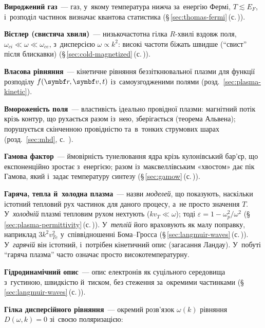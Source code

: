 	\item \textbf{Вироджений газ}~--- газ, у~якому температура нижча за~енергію Фермі, $T\lesssim E_F$, і~розподіл
	  частинок визначає квантова статистика (§\,\ref{sec:thomas-fermi}\,(с.\,\pageref{sec:thomas-fermi})).
	\item \textbf{Вістлер (свистяча хвиля)}~--- низькочастотна гілка $R$-хвилі вздовж поля, $\omega_{ci}\ll\omega\ll\omega_{ce}$, з~дисперсією
	  $\omega\propto k^2$: високі частоти біжать швидше (\enquote{свист} після блискавки) (§\,\ref{sec:cold-magnetized}\,(с.\,\pageref{sec:cold-magnetized})).
	\item \textbf{Власова рівняння}~--- кінетичне рівняння беззіткнювальної плазми для функції розподілу $f(\vect r,\vect v,t)$ із~самоузгодженими полями (розд.~\ref{sec:plasma-kinetic}).
	\item \textbf{Вмороженість поля}~--- властивість ідеально провідної плазми: магнітний потік крізь контур, що рухається разом із~нею, зберігається (теорема Альвена); порушується скінченною провідністю та~в~тонких струмових шарах (розд.~\ref{sec:mhd}, с.~\pageref{sec:mhd}).
	\item \textbf{Гамова фактор}~--- ймовірність тунелювання ядра крізь кулонівський бар'єр, що експоненційно зростає з~енергією; разом із~максвеллівським «хвостом» дає пік Гамова, який і~задає температуру синтезу (§\,\ref{sec:gamow}\,(с.\,\pageref{sec:gamow})).
	\item \textbf{Гаряча, тепла й~холодна плазма}~--- назви \emph{моделей}, що показують, наскільки істотний
	  тепловий рух частинок для даного процесу, а~не просто значення $T$. У~\emph{холодній} плазмі тепловим
	  рухом нехтують ($kv_T\ll\omega$); тоді $\varepsilon=1-\omega_p^2/\omega^2$ (§\,\ref{sec:plasma-permittivity}\,(с.\,\pageref{sec:plasma-permittivity})).
	  У~\emph{теплій} його враховують як малу поправку, наприклад $3k^2v_{Te}^2$ у~співвідношенні Бома--Гросса
	  (§\,\ref{sec:langmuir-waves}\,(с.\,\pageref{sec:langmuir-waves})). У~\emph{гарячій} він істотний, і~потрібен кінетичний опис (загасання Ландау).
	  У~побуті \enquote{гаряча плазма} часто означає просто високотемпературну.
	\item \textbf{Гідродинамічний опис}~--- опис електронів як суцільного середовища з~густиною, швидкістю й~тиском,
	  без стеження за~окремими частинками (§\,\ref{sec:langmuir-waves}\,(с.\,\pageref{sec:langmuir-waves})).
	\item \textbf{Гілка дисперсійного рівняння}~--- окремий розв'язок $\omega(k)$ рівняння $D(\omega,k)=0$ зі~своєю поляризацією:
